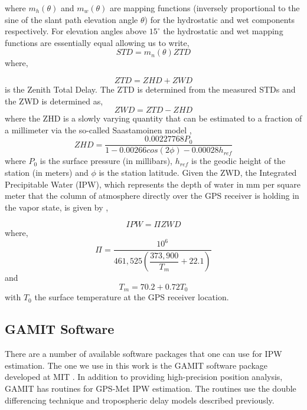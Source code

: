 \documentclass[proposal]{umassthesis}
\begin{document}
where $m_h(\theta)$ and $m_w(\theta)$ are mapping functions (inversely proportional to the sine of the slant path elevation angle $\theta$) for the hydrostatic and wet components respectively. For elevation angles above $15^{\circ}$ the hydrostatic and wet mapping functions are essentially equal allowing us to write,
\begin{equation}
STD = m_n(\theta) ZTD
\end{equation}
where,

\begin{equation}
ZTD = ZHD + ZWD
\end{equation}
is the Zenith Total Delay. The ZTD is determined from the measured STDs \cite{tralli1990stochastic} and the ZWD is determined as,
\begin{equation}
ZWD = ZTD - ZHD
\end{equation}
where the ZHD is a slowly varying quantity that can be estimated to a fraction of a millimeter via the so-called Saastamoinen model \cite{saastamoinen1972atmospheric},
\begin{equation}
ZHD = \dfrac{0.00227768 P_0}{1 - 0.00266 cos(2\phi) - 0.00028 h_{ref}}
\end{equation}
where $P_0$ is the surface pressure (in millibars), $h_{ref}$ is the geodic height of the station (in meters) and $\phi$ is the station latitude. Given the ZWD, the Integrated Precipitable Water (IPW), which represents the depth of water in mm per square meter that the column of atmosphere directly over the GPS receiver is holding in the vapor state, is given by \cite{bevis1994gps},

\begin{equation}
IPW = \Pi ZWD
\end{equation}
where,
\begin{equation}
\Pi = \dfrac{10^6}{461,525 ( \dfrac{373,900}{T_m} + 22.1 )}
\end{equation}
and
\begin{equation}
T_m = 70.2 + 0.72 T_0
\end{equation}
with $T_0$ the surface temperature at the GPS receiver location.

\subsection{GAMIT Software}
There are a number of available software packages that one can use for IPW estimation. The one we use in this work is the GAMIT software package developed at MIT \cite{herring2015gamit}. In addition to providing high-precision position analysis, GAMIT has routines for GPS-Met IPW estimation. The routines use the double differencing technique and tropospheric delay models described previously.
\end{document}
